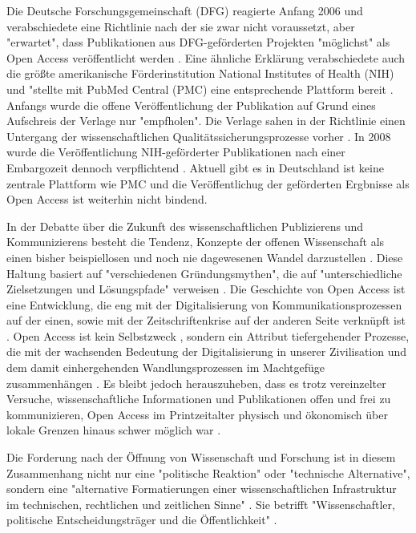 Die Deutsche Forschungsgemeinschaft (DFG) reagierte Anfang 2006 und verabschiedete eine Richtlinie nach der sie zwar nicht voraussetzt, aber "erwartet", dass Publikationen aus DFG-geförderten Projekten "möglichst" als Open Access veröffentlicht werden \cite{suchen:dfg-richtlinie}. Eine ähnliche Erklärung verabschiedete auch die größte amerikanische Förderinstitution National Institutes of Health (NIH) und "stellte mit PubMed Central (PMC) eine entsprechende Plattform bereit \cite{muller_2010_open}. Anfangs wurde die offene Veröffentlichung der Publikation auf Grund eines Aufschreis der Verlage nur "empfholen". Die Verlage sahen in der Richtlinie einen Untergang der wissenschaftlichen Qualitätssicherungsprozesse vorher \cite{Baggs_2006}. In 2008 wurde die Veröffentlichung NIH-geförderter Publikationen nach einer Embargozeit dennoch verpflichtend \cite{Hanekop_2014}. Aktuell gibt es in Deutschland ist keine zentrale Plattform wie PMC und die Veröffentlichug der geförderten Ergbnisse als Open Access ist weiterhin nicht bindend.

In der Debatte über die Zukunft des wissenschaftlichen Publizierens und Kommunizierens besteht die Tendenz, Konzepte der offenen Wissenschaft als einen bisher beispiellosen und noch nie dagewesenen Wandel darzustellen \cite{cite:17a} \cite{cite:17b}. Diese Haltung basiert auf "verschiedenen Gründungsmythen", die auf "unterschiedliche Zielsetzungen und Lösungspfade" verweisen \cite{suchen-Hoffmann-Zugang-undVerwertung-oeffentlicher-Informationen}. Die Geschichte von Open Access ist eine Entwicklung, die eng mit der Digitalisierung von Kommunikationsprozessen auf der einen, sowie mit der Zeitschriftenkrise auf der anderen Seite verknüpft ist \cite{suchen-Hoffmann-Zugang-undVerwertung-oeffentlicher-Informationen} \cite{yiotis_2013_open} \cite{wein_2010_erwerbung}. Open Access ist kein Selbstzweck \cite{cite:17d}, sondern ein Attribut tiefergehender Prozesse, die mit der wachsenden Bedeutung der Digitalisierung in unserer Zivilisation und dem damit einhergehenden Wandlungsprozessen im Machtgefüge zusammenhängen \cite{cite:17e}. Es bleibt jedoch herauszuheben, dass es trotz vereinzelter Versuche, wissenschaftliche Informationen und Publikationen offen und frei zu kommunizieren, Open Access im Printzeitalter physisch und ökonomisch über lokale Grenzen hinaus schwer möglich war \cite{cite:18a}.

Die Forderung nach der Öffnung von Wissenschaft und Forschung ist in diesem Zusammenhang nicht nur eine "politische Reaktion" oder "technische Alternative", sondern eine "alternative Formatierungen einer wissenschaftlichen Infrastruktur im technischen, rechtlichen und zeitlichen Sinne" \cite{kelty_2004}. Sie betrifft "Wissenschaftler, politische Entscheidungsträger und die Öffentlichkeit" \cite{Scheliga_2014}.


